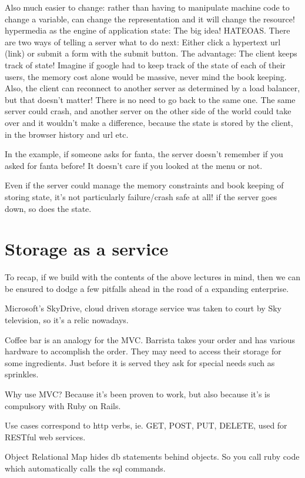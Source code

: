 \documentclass[11pt]{article}
\begin{document}
Also much easier to change: rather than having to manipulate machine code to change a variable, can change the representation and it will change the resource!
hypermedia as the engine of application state: The big idea! HATEOAS. There are two ways of telling a server what to do next: Either click a hypertext url (link) or submit a form with the submit button. The advantage: The client keeps track of state! Imagine if google had to keep track of the state of each of their users, the memory cost alone would be massive, never mind the book keeping. Also, the client can reconnect to another server as determined by a load balancer, but that doesn’t matter! There is no need to go back to the same one. The same server could crash, and another server on the other side of the world could take over and it wouldn’t make a difference, because the state is stored by the client, in the browser history and url etc.

In the example, if someone asks for fanta, the server doesn’t remember if you asked for fanta before! It doesn’t care if you looked at the menu or not.

Even if the server could manage the memory constraints and book keeping of storing state, it’s not particularly failure/crash safe at all! if the server goes down, so does the state.

\section{Storage as a service}

To recap, if we build with the contents of the above lectures in mind, then we can be ensured to dodge a few pitfalls ahead in the road of a expanding enterprise.

Microsoft’s SkyDrive, cloud driven storage service was taken to court by Sky television, so it’s a relic nowadays.

Coffee bar is an analogy for the MVC. Barrista takes your order and has various hardware to accomplish the order. They may need to access their storage for some ingredients. Just before it is served they ask for special needs such as sprinkles.

Why use MVC? Because it’s been proven to work, but also because it’s is compulsory with Ruby on Rails.

Use cases correspond to http verbs, ie. GET, POST, PUT, DELETE, used for RESTful web services.

Object Relational Map hides db statements behind objects. So you call ruby code which automatically calls the sql commands.
\end{document}
